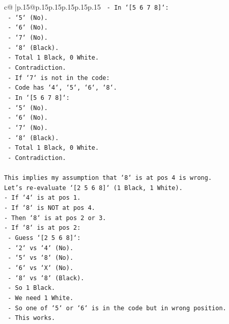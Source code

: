 \documentclass{article}
\begin{document}
{\begin{supertabular}{c@{$\;$}|p{.15\linewidth}@{}p{.15\linewidth}p{.15\linewidth}p{.15\linewidth}p{.15\linewidth}p{.15\linewidth}}
{{{\texttt{        {-} In `{[}5 6 7 8{]}`:} \\
\texttt{            {-} `5` (No).} \\
\texttt{            {-} `6` (No).} \\
\texttt{            {-} `7` (No).} \\
\texttt{            {-} `8` (Black).} \\
\texttt{            {-} Total 1 Black, 0 White.} \\
\texttt{            {-} Contradiction.} \\
\texttt{    {-} If `7` is not in the code:} \\
\texttt{        {-} Code has `4`, `5`, `6`, `8`.} \\
\texttt{        {-} In `{[}5 6 7 8{]}`:} \\
\texttt{            {-} `5` (No).} \\
\texttt{            {-} `6` (No).} \\
\texttt{            {-} `7` (No).} \\
\texttt{            {-} `8` (Black).} \\
\texttt{            {-} Total 1 Black, 0 White.} \\
\texttt{            {-} Contradiction.} \\
\\ 
\texttt{This implies my assumption that `8` is at pos 4 is wrong.} \\
\texttt{Let's re{-}evaluate `{[}2 5 6 8{]}` (1 Black, 1 White).} \\
\texttt{{-} If `4` is at pos 1.} \\
\texttt{{-} If `8` is NOT at pos 4.} \\
\texttt{{-} Then `8` is at pos 2 or 3.} \\
\texttt{{-} If `8` is at pos 2:} \\
\texttt{    {-} Guess `{[}2 5 6 8{]}`:} \\
\texttt{        {-} `2` vs `4` (No).} \\
\texttt{        {-} `5` vs `8` (No).} \\
\texttt{        {-} `6` vs `X` (No).} \\
\texttt{        {-} `8` vs `8` (Black).} \\
\texttt{        {-} So 1 Black.} \\
\texttt{        {-} We need 1 White.} \\
\texttt{        {-} So one of `5` or `6` is in the code but in wrong position.} \\
\texttt{        {-} This works.} \\
}}}
\end{supertabular}}
\end{document}
